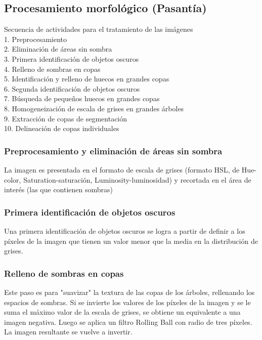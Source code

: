 \subsection{Procesamiento morfológico (Pasantía)} \label{Metodo Morfo}
Secuencia de actividades para el tratamiento de las imágenes\\
1. Preprocesamiento\\
2. Eliminación de áreas sin sombra\\
3. Primera identificación de objetos oscuros\\
4. Relleno de sombras en copas\\
5. Identificación y relleno de huecos en grandes copas\\
6. Segunda identificación de objetos oscuros\\
7. Búsqueda de pequeños huecos en grandes copas\\
8. Homogeneización de escala de grises en grandes árboles\\
9. Extracción de copas de segmentación\\
10.  Delineación de copas individuales\\

\subsubsection{Preprocesamiento y eliminación de áreas sin sombra}
La imagen es presentada en el formato de escala de grises (formato HSL, de Hue-color, Saturation-saturación, Luminosity-luminosidad) y recortada en el área de interés (las que contienen sombras)
\subsubsection{Primera identificación de objetos oscuros}
Una primera identificación de objetos oscuros se logra a partir de definir a los píxeles de la imagen que tienen un valor menor que la media en la distribución de grises.
\subsubsection{Relleno de sombras en copas}
Este paso es para "suavizar" la textura de las copas de los árboles, rellenando los espacios de sombras.
Si se invierte los valores de los píxeles de la imagen y se le suma el máximo valor de la escala de grises, se obtiene un equivalente a una imagen negativa. Luego se aplica un filtro Rolling Ball con radio de tres píxeles. La imagen resultante se vuelve a invertir.
